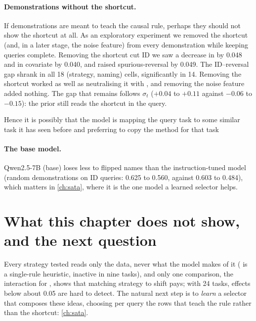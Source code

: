 \paragraph{Demonstrations without the shortcut.}
If demonstrations are meant to teach the causal rule, perhaps they should not show the shortcut at all.
As an exploratory experiment we removed the shortcut (and, in a later stage, the noise feature) from every demonstration while keeping queries complete.
Removing the shortcut cut ID we saw a decrease in \AUROC by 0.048 and in covariate \AUROC by 0.040, and raised spurious-reversal \AUROC by 0.049.
The ID--reversal gap shrank in all 18 (strategy, naming) cells, significantly in 14.
Removing the shortcut worked as well as neutralising it with , and removing the noise feature added nothing.
The gap that remains follows $\sigma_t$ ($+0.04$ to $+0.11$ against $-0.06$ to $-0.15$): the prior still reads the shortcut in the query.


Hence it is possibly that the model is mapping the query task to some similar task it has seen before and preferring to copy the method for that task

\paragraph{The base model.}
Qwen2.5-7B (base) loses less to flipped names than the instruction-tuned model (random demonstrations on ID queries: 0.625 to 0.560, against 0.603 to 0.484), which matters in \autoref{ch:sata}, where it is the one model a learned selector helps.

\section{What this chapter does not show, and the next question}

Every strategy tested reads only the data, never what the model makes of it ( is a single-rule heuristic, inactive in nine tasks), and only one comparison, the interaction for , shows that matching strategy to shift pays; with 24 tasks, effects below about 0.05 \AUROC are hard to detect.
The natural next step is to \emph{learn} a selector that composes these ideas, choosing per query the rows that teach the rule rather than the shortcut: \autoref{ch:sata}.